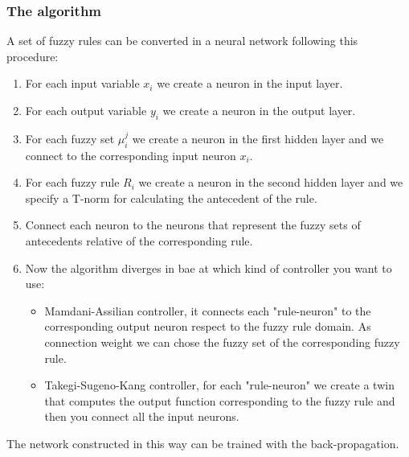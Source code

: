 \documentclass{article}
\begin{document}
\subsubsection{The algorithm}
A set of fuzzy rules can be converted in a neural network following this procedure:
\begin{enumerate}
    \item For each input variable $x_i$ we create a neuron in the input layer.
    \item For each output variable $y_i$ we create a neuron in the output layer.
    \item For each fuzzy set $\mu_i^j$ we create a neuron in the first hidden layer
          and we connect to the corresponding input neuron $x_i$.
    \item For each fuzzy rule $R_i$ we create a neuron in the second hidden layer
          and we specify a T-norm for calculating the antecedent of the rule.
    \item Connect each neuron to the neurons that represent the fuzzy sets of antecedents
          relative of the corresponding rule.
    \item Now the algorithm diverges in bae at which kind of controller you want to use:
          \begin{itemize}
              \item Mamdani-Assilian controller, it connects each "rule-neuron" to the corresponding
                    output neuron respect to the fuzzy rule domain. As connection weight we can chose
                    the fuzzy set of the corresponding fuzzy rule.
              \item Takegi-Sugeno-Kang controller, for each "rule-neuron" we create a twin that
                    computes the output function corresponding to the fuzzy rule and then you connect
                    all the input neurons.
          \end{itemize}
\end{enumerate}
The network constructed in this way can be trained with the back-propagation.
\end{document}
